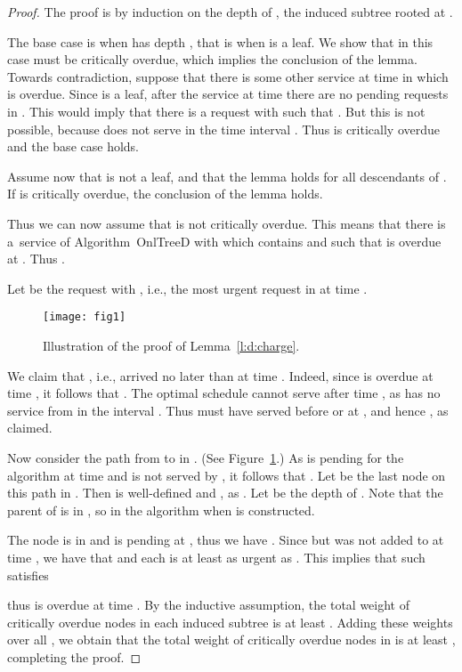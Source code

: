 \documentclass[a4paper]{article}
\newcommand{\OnAlgTreesDeadlines}{{\sc OnlTreeD}}
\begin{document}
\begin{proof}
The proof is by induction on the depth of , the induced
subtree rooted at . 

The base case is when  has depth , that is when  is a
leaf.  We show that in this case  must be critically overdue, which
implies the conclusion of the lemma.  Towards contradiction, suppose
that there is some other service at time 
in which  is overdue.  Since  is a leaf, after the service at
time  there are no pending requests in .  This
would imply that there is a request  with 
such that .  But this is not
possible, because  does not serve  in the time
interval .  Thus  is critically overdue and the
base case holds.

Assume now that  is not a leaf, and that the lemma holds for all
descendants of .  If  is critically overdue, the conclusion of
the lemma holds.

Thus we can now assume that  is not critically overdue. This means
that there is a~service  of Algorithm~{\OnAlgTreesDeadlines}
with  which contains  and such that  is
overdue at .  Thus .

Let  be the request with , i.e., the most
urgent request in  at time .


\begin{figure}
\begin{center}
\texttt{[image: fig1]}
\caption{Illustration of the proof of Lemma~\ref{l:d:charge}.}
\label{fig: online mlapd analysis}
\end{center}
\end{figure}

We claim that , i.e.,  arrived no later than
at time . Indeed, since  is overdue at time , it follows
that .  The optimal schedule
 cannot serve  after time , as  has no
service from  in the interval . Thus  must
have served  before or at , and hence , as
claimed.

Now consider the path from  to  in .  (See
Figure~\ref{fig: online mlapd analysis}.)  As  is pending
for the algorithm at time  and  is not served by ,
it follows that .  Let  be the last node
on this path in . Then  is well-defined and , as
. Let  be the depth of .  Note that the parent of  is
in , so  in the algorithm when  is constructed.

The node  is in  and  is pending at
, thus we have .  Since  but  was
not added to  at time , we have that  and each  is at least as urgent as .
This implies that such  satisfies

thus  is overdue at time . By the inductive assumption, the
total weight of critically overdue nodes in each induced 
subtree  is at
least . Adding these weights over all ,
we obtain that the total weight of critically overdue nodes in  is at
least , completing the proof.
\end{proof}
\end{document}
